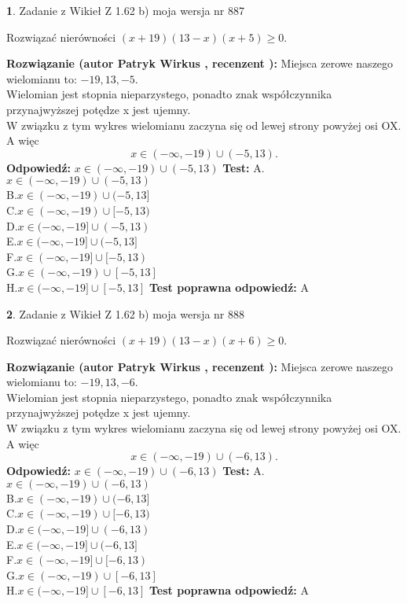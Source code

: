 \documentclass[12pt, a4paper]{article}
\theoremstyle{definition} %
\newtheorem{zad}{}
\newcommand{\zadStart}[1]{\begin{zad}#1\newline}
\newcommand{\zadStop}{\end{zad}}
\newcommand{\rozwStart}[2]{\noindent \textbf{Rozwiązanie (autor #1 , recenzent #2): }\newline}
\newcommand{\rozwStop}{\newline}
\newcommand{\odpStart}{\noindent \textbf{Odpowiedź:}\newline}
\newcommand{\odpStop}{\newline}
\newcommand{\testStart}{\noindent \textbf{Test:}\newline}
\newcommand{\testStop}{\newline}
\newcommand{\kluczStart}{\noindent \textbf{Test poprawna odpowiedź:}\newline}
\newcommand{\kluczStop}{\newline}
\begin{document}
\zadStart{Zadanie z Wikieł Z 1.62 b) moja wersja nr 887}

Rozwiązać nierówności $(x+19)(13-x)(x+5)\ge0$.
\zadStop
\rozwStart{Patryk Wirkus}{}
Miejsca zerowe naszego wielomianu to: $-19, 13, -5$.\\
Wielomian jest stopnia nieparzystego, ponadto znak współczynnika przy\linebreak najwyższej potędze x jest ujemny.\\ W związku z tym wykres wielomianu zaczyna się od lewej strony powyżej osi OX. A więc $$x \in (-\infty,-19) \cup (-5,13).$$
\rozwStop
\odpStart
$x \in (-\infty,-19) \cup (-5,13)$
\odpStop
\testStart
A.$x \in (-\infty,-19) \cup (-5,13)$\\
B.$x \in (-\infty,-19) \cup (-5,13]$\\
C.$x \in (-\infty,-19) \cup [-5,13)$\\
D.$x \in (-\infty,-19] \cup (-5,13)$\\
E.$x \in (-\infty,-19] \cup (-5,13]$\\
F.$x \in (-\infty,-19] \cup [-5,13)$\\
G.$x \in (-\infty,-19) \cup [-5,13]$\\
H.$x \in (-\infty,-19] \cup [-5,13]$
\testStop
\kluczStart
A
\kluczStop



\zadStart{Zadanie z Wikieł Z 1.62 b) moja wersja nr 888}

Rozwiązać nierówności $(x+19)(13-x)(x+6)\ge0$.
\zadStop
\rozwStart{Patryk Wirkus}{}
Miejsca zerowe naszego wielomianu to: $-19, 13, -6$.\\
Wielomian jest stopnia nieparzystego, ponadto znak współczynnika przy\linebreak najwyższej potędze x jest ujemny.\\ W związku z tym wykres wielomianu zaczyna się od lewej strony powyżej osi OX. A więc $$x \in (-\infty,-19) \cup (-6,13).$$
\rozwStop
\odpStart
$x \in (-\infty,-19) \cup (-6,13)$
\odpStop
\testStart
A.$x \in (-\infty,-19) \cup (-6,13)$\\
B.$x \in (-\infty,-19) \cup (-6,13]$\\
C.$x \in (-\infty,-19) \cup [-6,13)$\\
D.$x \in (-\infty,-19] \cup (-6,13)$\\
E.$x \in (-\infty,-19] \cup (-6,13]$\\
F.$x \in (-\infty,-19] \cup [-6,13)$\\
G.$x \in (-\infty,-19) \cup [-6,13]$\\
H.$x \in (-\infty,-19] \cup [-6,13]$
\testStop
\kluczStart
A
\kluczStop
\end{document}
